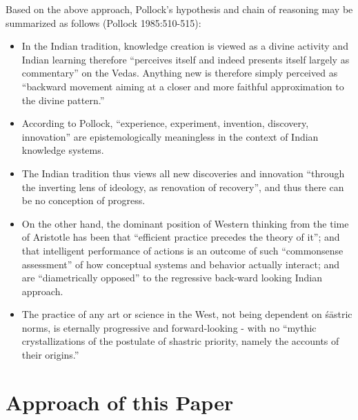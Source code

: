 Based on the above approach, Pollock's hypothesis and chain of reasoning may be summarized as follows (Pollock 1985:510-515): 
\begin{itemize}
\item In the Indian tradition, knowledge creation is viewed as a divine activity and Indian learning therefore ``perceives itself and indeed presents itself largely as commentary'' on the Vedas. Anything new is therefore simply perceived as ``backward movement aiming at a closer and more faithful approximation to the divine pattern.''

\item According to Pollock, ``experience, experiment, invention, discovery, innovation'' are epistemologically meaningless in the context of Indian knowledge systems.

\item The Indian tradition thus views all new discoveries and innovation ``through the inverting lens of ideology, as renovation of recovery'', and thus there can be no conception of progress.

\item On the other hand, the dominant position of Western thinking from the time of Aristotle has been that ``efficient practice precedes the theory of it''; and that intelligent performance of actions is an outcome of such ``commonsense assessment'' of how conceptual systems and behavior actually interact; and are ``diametrically opposed'' to the regressive back-ward looking Indian approach. 

\item The practice of any art or science in the West, not being dependent on śāstric norms, is eternally progressive and forward-looking - with no ``mythic crystallizations of the postulate of shastric priority, namely the accounts of their origins.''
\end{itemize}

\section*{Approach of this Paper}


